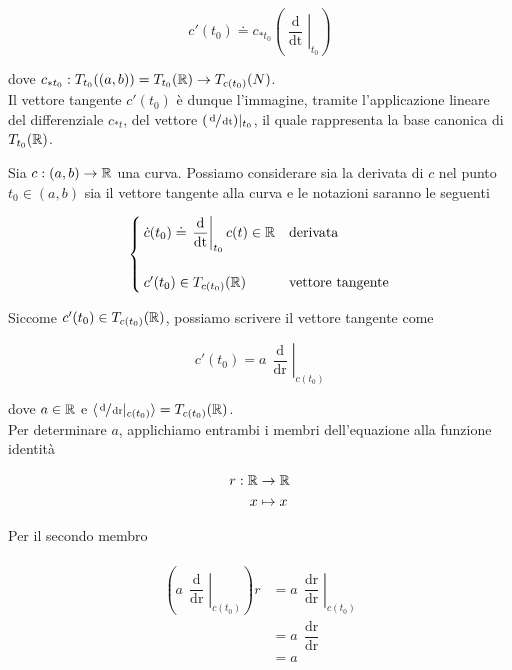 \begin{equation}
	c'(t_{0}) \doteq c_{*t_{0}} \left( \left. \dfrac{\operatorname{d}}{\operatorname{dt}} \right|_{t_{0}} \right)
\end{equation}

dove $ c_{*t_{0}} : T_{t_{0}}((a,b)) = T_{t_{0}}(\mathbb{R}) \to T_{c(t_{0})}(N) $.\\
Il vettore tangente $ c'(t_{0}) $ è dunque l'immagine, tramite l'applicazione lineare del differenziale $ c_{*t} $, del vettore $ (\sfrac{\operatorname{d}}{\operatorname{dt}}) |_{t_{0}} $, il quale rappresenta la base canonica di $ T_{t_{0}}(\mathbb{R}) $.

\begin{remark}
	Sia $ c : (a,b) \to \mathbb{R} $ una curva. Possiamo considerare sia la derivata di $ c $ nel punto $ t_{0} \in (a,b) $ sia il vettore tangente alla curva e le notazioni saranno le seguenti
	
	\begin{equation}
		\begin{cases}
			\dot{c}(t_{0}) \doteq \left. \dfrac{\operatorname{d}}{\operatorname{dt}} \right|_{t_{0}} c(t) \in \mathbb{R} & \text{derivata}\\\\
			c'(t_{0}) \in T_{c(t_{0})}(\mathbb{R}) & \text{vettore tangente}
		\end{cases}
	\end{equation}
\end{remark}

Siccome $ c'(t_{0}) \in T_{c(t_{0})}(\mathbb{R}) $, possiamo scrivere il vettore tangente come

\begin{equation}
	c'(t_{0}) = a \, \left. \dfrac{\operatorname{d}}{\operatorname{dr}} \right|_{c(t_{0})}
\end{equation}

dove $ a \in \mathbb{R} $ e $ \langle \sfrac{\operatorname{d}}{\operatorname{dr}} |_{c(t_{0})} \rangle = T_{c(t_{0})}(\mathbb{R}) $.\\
Per determinare $ a $, applichiamo entrambi i membri dell'equazione alla funzione identità

\begin{align}
	\begin{split}
		r : \mathbb{R} &\to \mathbb{R}\\
		x &\mapsto x
	\end{split}
\end{align}

Per il secondo membro

\begin{align}
	\begin{split}
		\left( a \, \left. \dfrac{\operatorname{d}}{\operatorname{dr}} \right|_{c(t_{0})} \right) r &= a \, \left. \dfrac{\operatorname{dr}}{\operatorname{dr}} \right|_{c(t_{0})}\\
		&= a \, \dfrac{\operatorname{dr}}{\operatorname{dr}}\\
		&= a
	\end{split}
\end{align}


